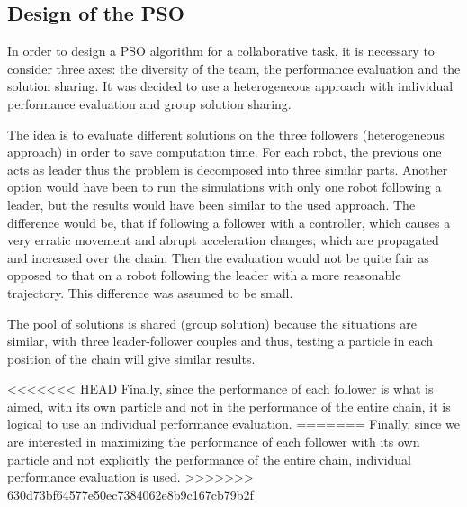 \documentclass[a4paper, 10pt, conference]{ieeeconf}      %
\begin{document}
\subsection{Design of the PSO}
In order to design a PSO algorithm for a collaborative task, it is necessary to consider three axes: the diversity of the team, the performance evaluation and the solution sharing. It was decided  to use a heterogeneous approach with individual performance evaluation and group solution sharing. 

The idea is to evaluate different solutions on the three followers (heterogeneous approach) in order to save computation time. For each robot, the previous one acts as leader thus the problem is decomposed into three similar parts. Another option would have been to run the simulations with only one robot following a leader, but the results would have been similar to the used approach. The difference would be, that if following a follower with a controller, which causes a very erratic movement and abrupt acceleration changes, which are propagated and increased over the chain. Then the evaluation would not be quite fair as opposed to that on a robot following the leader with a more reasonable trajectory. This difference was assumed to be small.

The pool of solutions is shared (group solution) because the situations are similar, with three leader-follower couples and thus, testing a particle in each position of the chain will give similar results.

<<<<<<< HEAD
Finally, since the performance of each follower is what is aimed, with its own particle and not in the performance of the entire chain, it is logical to use an individual performance evaluation.
=======
Finally, since we are interested in maximizing the performance of each follower with its own particle and not explicitly the performance of the entire chain, individual performance evaluation is used.
>>>>>>> 630d73bf64577e50ec7384062e8b9c167cb79b2f
\end{document}
